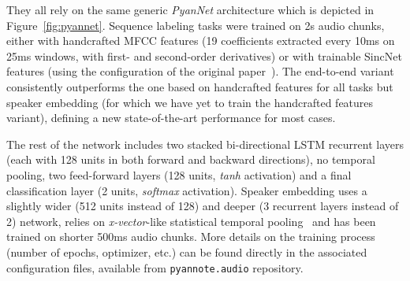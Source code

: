 \documentclass{article}
\begin{document}
They all rely on the same generic \emph{PyanNet} architecture which is depicted in Figure~\ref{fig:pyannet}. Sequence labeling tasks were trained on 2s audio chunks, either with handcrafted MFCC features (19 coefficients extracted every 10ms on 25ms windows, with first- and second-order derivatives) or with trainable SincNet features (using the configuration of the original paper~\cite{Ravanelli2018}). The end-to-end variant consistently outperforms the one based on handcrafted features for all tasks but speaker embedding (for which we have yet to train the handcrafted features variant), defining a new state-of-the-art performance for most cases.

The rest of the network includes two stacked bi-directional LSTM recurrent layers (each with 128 units in both forward and backward directions), no temporal pooling, two feed-forward layers (128 units, \emph{tanh} activation) and a final classification layer (2 units, \emph{softmax} activation). Speaker embedding uses a slightly wider (512 units instead of 128) and deeper (3 recurrent layers instead of 2) network, relies on \emph{x-vector}-like statistical temporal pooling~\cite{x-vector} and has been trained on shorter 500ms audio chunks. More details on the training process (number of epochs, optimizer, etc.) can be found directly in the associated configuration files, available from {\small \texttt{pyannote.audio}} repository.

\newpage



\end{document}
